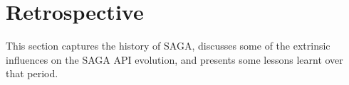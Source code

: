 \documentclass[]{article}
\begin{document}





\section{Retrospective}
\label{sec:retro}

 This section captures the history of SAGA, discusses some of the
 extrinsic influences on the SAGA API evolution, and presents some
 lessons learnt over that period.  

\end{document}
